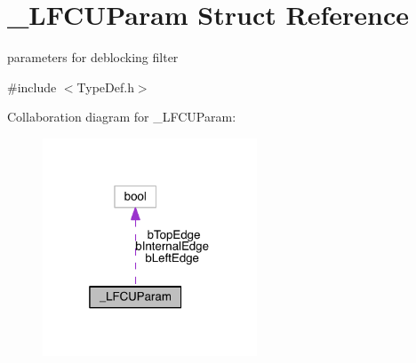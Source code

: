 \hypertarget{struct___l_f_c_u_param}{}\section{\+\_\+\+L\+F\+C\+U\+Param Struct Reference}
\label{struct___l_f_c_u_param}


parameters for deblocking filter  




{\ttfamily \#include $<$Type\+Def.\+h$>$}



Collaboration diagram for \+\_\+\+L\+F\+C\+U\+Param\+:
\nopagebreak
\begin{figure}[H]
\begin{center}
\leavevmode
\includegraphics[width=181pt]{dc/df1/struct___l_f_c_u_param__coll__graph}
\end{center}
\end{figure}
